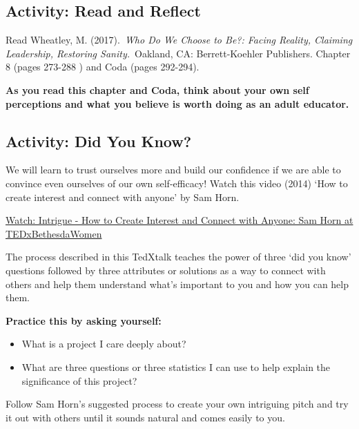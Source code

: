 \documentclass[
]{book}
\providecommand{\tightlist}{%
  \setlength{\itemsep}{0pt}\setlength{\parskip}{0pt}}
\begin{document}
\hypertarget{activity-read-and-reflect-1}{%
\subsection*{Activity: Read and Reflect}\label{activity-read-and-reflect-1}}

\begin{reflect}
Read Wheatley, M. (2017).~\emph{Who Do We Choose to Be?: Facing Reality, Claiming Leadership, Restoring Sanity.}~Oakland, CA: Berrett-Koehler Publishers. Chapter 8 (pages 273-288 ) and Coda (pages 292-294).

\textbf{As you read this chapter and Coda, think about your own self perceptions and what you believe is worth doing as an adult educator.}
\end{reflect}

\hypertarget{activity-did-you-know}{%
\subsection*{Activity: Did You Know?}\label{activity-did-you-know}}

\begin{reflect}
We will learn to trust ourselves more and build our confidence if we are able to convince even ourselves of our own self-efficacy! Watch this video (2014) `How to create interest and connect with anyone' by Sam Horn.

\href{https://www.youtube.com/watch?v=Xlg8zdSVjgg}{Watch: Intrigue - How to Create Interest and Connect with Anyone: Sam Horn at TEDxBethesdaWomen}

The process described in this TedXtalk teaches the power of three `did you know' questions followed by three attributes or solutions as a way to connect with others and help them understand what's important to you and how you can help them.

\textbf{Practice this by asking yourself:}

\begin{itemize}
\tightlist
\item
  What is a project I care deeply about?\\
\item
  What are three questions or three statistics I can use to help explain the significance of this project?
\end{itemize}

Follow Sam Horn's suggested process to create your own intriguing pitch
and try it out with others until it sounds natural and comes easily to
you.
\end{reflect}
\end{document}
